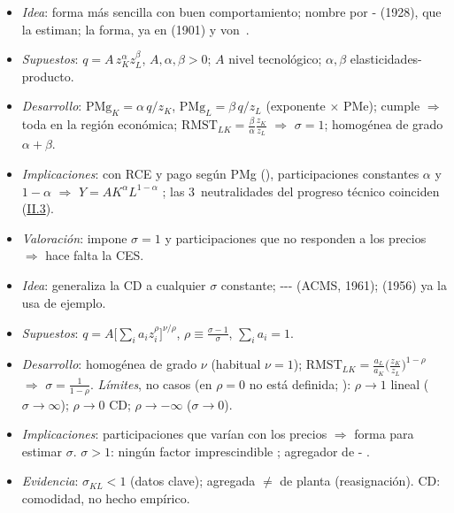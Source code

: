 \documentclass{article}
\begin{document}
\begin{columnas}
\begin{itemize}
\item \emph{Idea}: forma más sencilla con buen comportamiento; nombre por - (1928), que la estiman; la forma, ya en  (1901) y von~.
\item \emph{Supuestos}: $q=A\,z_K^{\alpha}z_L^{\beta}$, $A,\alpha,\beta>0$; $A$ nivel tecnológico; $\alpha,\beta$ elasticidades-producto.
\item \emph{Desarrollo}: $\mathrm{PMg}_K=\alpha\,q/z_K$, $\mathrm{PMg}_L=\beta\,q/z_L$ (exponente $\times$ PMe); cumple  $\Rightarrow$ toda en la región económica; $\mathrm{RMST}_{LK}=\frac{\beta}{\alpha}\frac{z_K}{z_L}$ $\Rightarrow$ $\sigma=1$; homogénea de grado $\alpha+\beta$.
\item \emph{Implicaciones}: con RCE y pago según PMg (), participaciones constantes $\alpha$ y $1-\alpha$ $\Rightarrow$ $Y=AK^{\alpha}L^{1-\alpha}$ ; las 3~neutralidades del progreso técnico coinciden (\hyperref[rep:II.3]{II.3}).
\item \emph{Valoración}: impone $\sigma=1$ y participaciones que no responden a los precios $\Rightarrow$ hace falta la CES.
\end{itemize}

\begin{itemize}
\item \emph{Idea}: generaliza la CD a cualquier $\sigma$ constante; --- (ACMS, 1961);  (1956) ya la usa de ejemplo.
\item \emph{Supuestos}: $q=A\big[\sum_ia_iz_i^{\rho}\big]^{\nu/\rho}$, $\rho\equiv\frac{\sigma-1}{\sigma}$, $\sum_ia_i=1$.
\item \emph{Desarrollo}: homogénea de grado $\nu$ (habitual $\nu=1$); $\mathrm{RMST}_{LK}=\frac{a_L}{a_K}\big(\frac{z_K}{z_L}\big)^{1-\rho}$ $\Rightarrow$ $\sigma=\frac{1}{1-\rho}$. \emph{Límites}, no casos (en $\rho=0$ no está definida; ): $\rho\to1$ lineal ($\sigma\to\infty$); $\rho\to0$ CD; $\rho\to-\infty$  ($\sigma\to0$).
\item \emph{Implicaciones}: participaciones que varían con los precios $\Rightarrow$ forma para estimar $\sigma$. $\sigma>1$: ningún factor imprescindible ; agregador de - .
\item \emph{Evidencia}: $\sigma_{KL}<1$ (datos clave); agregada $\neq$ de planta (reasignación). CD: comodidad, no hecho empírico.
\end{itemize}


\end{columnas}
\end{document}
